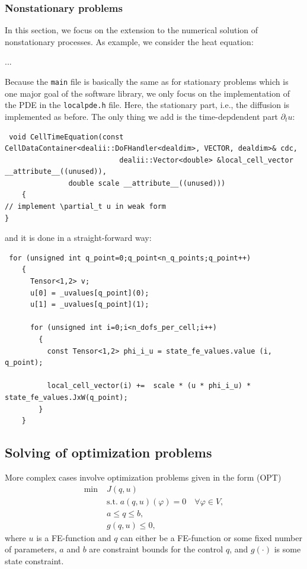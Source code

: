 \documentclass[prodmode,acmtoms]{acmsmall}
\numberwithin{equation}{section}
\renewcommand{\phi}{\varphi}
\begin{document}
\subsubsection{Nonstationary problems}
In this section, we focus on the extension to 
the numerical solution of nonstationary processes. 
As example, we consider the heat equation:

...


Because the \texttt{main} file 
is basically the same as for stationary problems
which is one major goal of the software library,
we only focus on the implementation of the PDE in the 
\texttt{localpde.h} file. Here, the stationary part, i.e.,
the diffusion is implemented as before. The only thing we add 
is the time-depdendent part $\partial_t u$:

\begin{lstlisting}
 void CellTimeEquation(const CellDataContainer<dealii::DoFHandler<dealdim>, VECTOR, dealdim>& cdc,
                           dealii::Vector<double> &local_cell_vector __attribute__((unused)),
		       double scale __attribute__((unused)))
    {
// implement \partial_t u in weak form
}
\end{lstlisting}
and it is done in a straight-forward way:
\begin{lstlisting}
 for (unsigned int q_point=0;q_point<n_q_points;q_point++)
	{
	  Tensor<1,2> v;
	  u[0] = _uvalues[q_point](0);
	  u[1] = _uvalues[q_point](1);

	  for (unsigned int i=0;i<n_dofs_per_cell;i++)
	    {
	      const Tensor<1,2> phi_i_u = state_fe_values.value (i, q_point);

	      local_cell_vector(i) +=  scale * (u * phi_i_u) * state_fe_values.JxW(q_point);
	    }
	}
\end{lstlisting}








\subsection{Solving of optimization problems}
More complex cases involve optimization problems given in the form (OPT)
\begin{align*}
\min\;&J(q,u) \\
  &\text{s.t.}\; a(q,u)(\phi) = 0 \quad \forall \phi\in V,\\
  &a \le q \le b,\\
  &g(q,u) \le 0,  
\end{align*}
where $u$ is a FE-function and $q$ can either be a FE-function or some 
fixed number of parameters, $a$ and $b$ are constraint bounds for the control $q$,
and $g(\cdot)$ is some state constraint.
\end{document}
